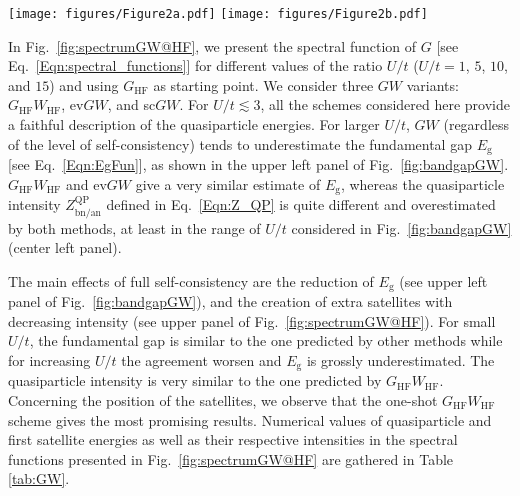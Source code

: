 \documentclass[aps,prb,reprint,superscriptaddress]{revtex4-1}
\newcommand{\Eg}{E_\text{g}}
\newcommand{\bn}{\text{bn}}
\newcommand{\an}{\text{an}}
\begin{document}
\begin{figure*}
  \texttt{[image: figures/Figure2a.pdf]}
  \hspace{0.05\textwidth}
  \texttt{[image: figures/Figure2b.pdf]}
 \caption{Fundamental gap ($\Eg$), quasiparticle weight factors ($Z_{\bn/\an}^\text{QP}$), and ground state energy ($E_0$) as functions of $U/t$ obtained from one-shot $GW$ (dashed red line), ev$GW$ (dashed-dotted blue line), sc$GW$ (dotted green line) using $G_{\text{HF}}$ (left) or $G_0$ (right) as starting point. The black curves are the exact results.}
\label{fig:bandgapGW}
\end{figure*}

In Fig.~\ref{fig:spectrumGW@HF}, we present the spectral function of $G$ [see Eq.~\eqref{Eqn:spectral_functions}] for different values of the ratio $U/t$ ($U/t=1$, $5$, $10$, and $15$) and using $G_{\text{HF}}$ as starting point. We consider three $GW$ variants: $G_{\text{HF}}W_{\text{HF}}$, ev$GW$, and sc$GW$.
For $U/t\lesssim3$, all the schemes considered here provide a faithful description of the quasiparticle energies. For larger $U/t$, $GW$ (regardless of the level of self-consistency) tends to underestimate the fundamental gap $\Eg$ [see Eq.~\eqref{Eqn:EgFun}], as shown in the upper left panel of Fig.~\ref{fig:bandgapGW}. $G_{\text{HF}}W_{\text{HF}}$ and ev$GW$ give a very similar estimate of $\Eg$, whereas the quasiparticle intensity $Z_{\bn/\an}^\text{QP}$ defined in Eq.~\eqref{Eqn:Z_QP}
is quite different and overestimated by both methods, at least in the range of $U/t$ considered in Fig.~\ref{fig:bandgapGW} (center left panel).

The main effects of full self-consistency are the reduction of $\Eg$ (see upper left panel of Fig.~\ref{fig:bandgapGW}), and the creation of extra satellites with decreasing intensity (see upper panel of Fig.~\ref{fig:spectrumGW@HF}).
For small $U/t$, the fundamental gap is similar to the one predicted by other methods while for increasing $U/t$ the agreement worsen and $\Eg$ is grossly underestimated. The quasiparticle intensity is very similar to the one predicted by $G_{\text{HF}}W_{\text{HF}}$.
Concerning the position of the satellites, we observe that the one-shot $G_{\text{HF}}W_{\text{HF}}$ scheme gives the most promising results. Numerical values of quasiparticle and first satellite energies as well as their respective intensities in the spectral functions presented in Fig.~\ref{fig:spectrumGW@HF} are gathered in Table \ref{tab:GW}. 
\end{document}
